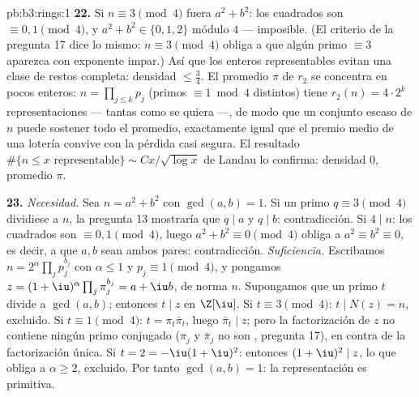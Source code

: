 \begin{solution}{pb:b3:rings:1}
\textbf{22.} Si $n \equiv 3 \pmod4$ fuera $a^2 + b^2$: los cuadrados son
$\equiv 0, 1 \pmod 4$, y $a^2 + b^2 \in \{0, 1, 2\}$ módulo $4$ ---
imposible. (El criterio de la pregunta 17 dice lo mismo:
$n \equiv 3 \pmod 4$ obliga a que algún primo $\equiv 3$ aparezca con
exponente impar.) Así que los enteros representables evitan una clase de
restos completa: densidad $\leq \frac34$. El promedio $\pi$ de $r_2$ se
concentra en pocos enteros: $n = \prod_{j\leq k}p_j$ (primos
$\equiv 1 \bmod 4$ distintos) tiene $r_2(n) = 4\cdot2^k$
representaciones --- tantas como se quiera ---, de modo que un conjunto
escaso de $n$ puede sostener todo el promedio, exactamente igual que el
premio medio de una lotería convive con la pérdida casi segura. El
resultado $\#\{n \leq x \text{ representable}\} \sim
Cx/\sqrt{\log x}$ de Landau lo confirma: densidad $0$, promedio $\pi$.

\textbf{23.} \emph{Necesidad.} Sea $n = a^2 + b^2$ con $\gcd(a, b) = 1$.
Si un primo $q \equiv 3 \pmod 4$ dividiese a $n$, la pregunta 13
mostraría que $q \mid a$ y $q \mid b$: contradicción. Si $4 \mid n$: los
cuadrados son $\equiv 0, 1 \pmod 4$, luego $a^2 + b^2
\equiv 0 \pmod 4$ obliga a $a^2 \equiv b^2 \equiv 0$, es decir, a que
$a,
b$ sean ambos pares: contradicción. \emph{Suficiencia.} Escribamos $n =
2^{\alpha}\prod_jp_j^{b_j}$ con $\alpha \leq 1$ y $p_j
\equiv 1 \pmod 4$, y pongamos $z = (1+\iu)^{\alpha}\prod_j
\pi_j^{b_j} = a + \iu b$, de norma $n$. Supongamos que un primo $t$
divide a $\gcd(a, b)$; entonces $t \mid z$ en $\Z[\iu]$. Si $t
\equiv 3 \pmod 4$: $t \mid N(z) = n$, excluido. Si $t \equiv 1
\pmod 4$: $t = \pi_t\bar\pi_t$, luego $\bar\pi_t \mid z$; pero la
factorización de $z$ no contiene ningún primo conjugado ($\pi_j$ y
$\bar\pi_j$ no son , pregunta 17), en contra de la
factorización única. Si $t = 2 = -\iu(1+\iu)^2$: entonces
$(1+\iu)^2 \mid z$, lo que obliga a $\alpha \geq 2$, excluido. Por tanto
$\gcd(a, b) = 1$: la representación es primitiva.


\end{solution}
